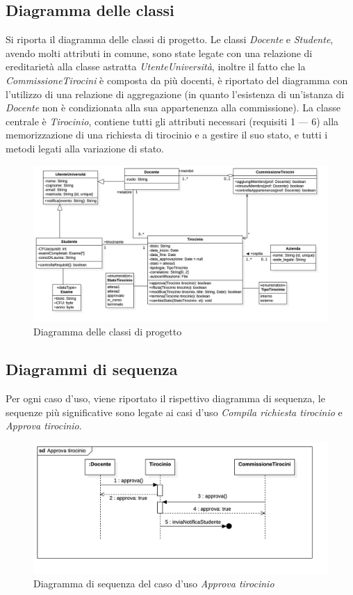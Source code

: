 \documentclass[12pt]{article}
\begin{document}
\subsection{Diagramma delle classi}
\label{sec:claprogetto}

Si riporta il diagramma delle classi di progetto. Le classi \emph{Docente} e \emph{Studente}, avendo molti attributi in comune, sono state legate con una relazione di ereditarietà alla classe astratta \emph{UtenteUniversità}, inoltre il fatto che la \emph{CommissioneTirocini} è composta da più docenti, è riportato del diagramma con l'utilizzo di una relazione di aggregazione (in quanto l'esistenza di un'istanza di \emph{Docente} non è condizionata alla sua appartenenza alla commissione). La classe centrale è \emph{Tirocinio}, contiene tutti gli attributi necessari (requisiti 1 — 6) alla memorizzazione di una richiesta di tirocinio e a gestire il suo stato, e tutti i metodi legati alla variazione di stato.

\begin{figure}[htb!]
   \centering
   \includegraphics[width=\textwidth]{images/ClassDiagramProgetto.jpg}
   \caption*{Diagramma delle classi di progetto}
\end{figure}


\subsection{Diagrammi di sequenza}

Per ogni caso d'uso, viene riportato il rispettivo diagramma di sequenza, le sequenze più significative sono legate ai casi d'uso \emph{Compila richiesta tirocinio} e \emph{Approva tirocinio}.

\begin{figure}[htb!]
   \centering
   \includegraphics[width=\textwidth]{images/Approva tirocinio.jpg}
   \caption*{Diagramma di sequenza del caso d'uso \emph{Approva tirocinio}}
\end{figure}
\end{document}
